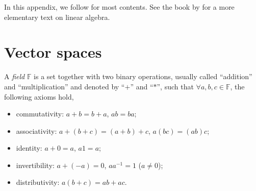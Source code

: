 \begin{rem}
  In this appendix, we follow
  \cite{axler15:_linear_algeb_done_right}
  for most contents.
  See the book by \cite{strang16:_introd_linear_algeb}
  for a more elementary text on linear algebra.
\end{rem}


\section{Vector spaces}
\label{sec:vector-spaces}

\begin{defn}
  \label{def:field}
  A \emph{field} $\mathbb{F}$ is a set together with two binary operations,
  usually called ``addition'' and ``multiplication''
  and denoted by ``$+$'' and ``$*$'',
  such that $\forall a,b,c\in\mathbb{F}$,
  the following axioms hold,
  \begin{itemize}\itemsep0em
  \item commutativity: $a+b=b+a$, $ab=ba$;
  \item associativity: $a+(b+c)=(a+b)+c$, $a(bc)=(ab)c$;
  \item identity: $a+0=a$, $a1=a$; %
  \item invertibility: $a+(-a)=0$, $a a^{-1}=1$ ($a\ne 0$);
  \item distributivity: $a(b+c)=ab+ac$.
  \end{itemize}
\end{defn}

